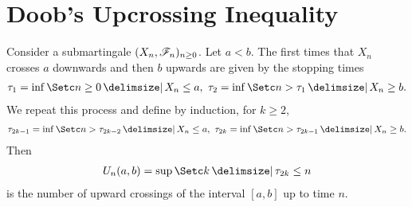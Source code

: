 \documentclass[12pt]{article}
\begin{document}
\section{Doob's Upcrossing Inequality}

Consider a submartingale $(X_n,\mathscr{F}_n)_{n\geq0}$. Let $a<b$. The first times that $X_n$ crosses $a$ downwards and then $b$ upwards are given by the stopping times
\begin{align*}
\tau_1 = \inf\set{n\geq 0 \given X_n \leq a},\ \tau_2 = \inf\set{n>\tau_1 \given X_n\geq b}.
\end{align*}
We repeat this process and define by induction, for $k\geq2$,
\begin{align*}
\tau_{2k-1} = \inf\set{n> \tau_{2k-2} \given X_n \leq a},\ \tau_{2k} = \inf\set{n>\tau_{2k-1} \given X_n\geq b}.
\end{align*}
Then 
\begin{align*}
U_n(a,b) = \sup\set{k \given \tau_{2k} \leq n}
\end{align*}
is the number of upward crossings of the interval $[a,b]$ up to time $n$.
\end{document}
